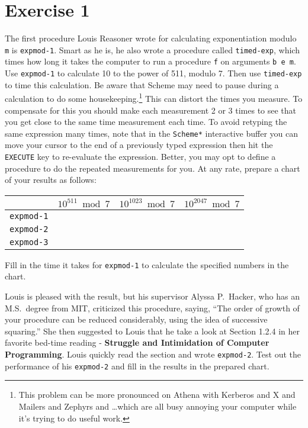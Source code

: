 \section{Exercise 1}

The first procedure Louis Reasoner wrote for calculating exponentiation modulo
{\tt m} is {\tt expmod-1}.  Smart as he is, he also wrote a procedure called
{\tt timed-exp}, which times how long it takes the computer to run a procedure
{\tt f} on arguments {\tt b e m}.  Use {\tt expmod-1} to calculate 10 to the
power of 511, modulo 7.  Then use {\tt timed-exp} to time this calculation.  Be
aware that {\sc Scheme} may need to pause during a calculation to do some
housekeeping.\footnote{This problem can be more pronounced on Athena with
Kerberos and X and Mailers and Zephyrs and \ldots which are all busy annoying
your computer while it's trying to do useful work.} This can distort the times
you measure.  To compensate for this you should make each measurement 2 or 3
times to see that you get close to the same time measurement each time.  To
avoid retyping the same expression many times, note that in the {\tt *Scheme*}
interactive buffer you can move your cursor to the end of a previously typed
expression then hit the {\tt EXECUTE} key to re-evaluate the expression.
Better, you may opt to define a procedure to do the repeated measurements for
you.  At any rate, prepare a chart of your results as follows:

\begin{center}
\begin{tabular}{||l|r|r|r||}
\hline
& $10^{511} \bmod 7$ & $10^{1023} \bmod 7$ & $10^{2047} \bmod 7$\\ \hline
{\tt expmod-1}& & & \\ \hline
{\tt expmod-2}& & & \\ \hline
{\tt expmod-3}& & & \\ \hline
\end{tabular}
\end{center}

Fill in the time it takes for {\tt expmod-1} to calculate the specified
numbers in the chart.

Louis is pleased with the result, but his supervisor Alyssa P.\ Hacker,
who has an M.S.\ degree from MIT, criticized this procedure, saying, 
``The order of growth of your procedure can be reduced considerably, using the
idea of successive squaring.''  She then suggested to Louis that he take a look 
at Section 1.2.4 in her favorite bed-time reading - {\bf Struggle and
Intimidation of Computer Programming}.  Louis quickly read the
section and wrote {\tt expmod-2}.  Test out the performance of his
{\tt expmod-2} and fill in the results in the prepared chart. 

